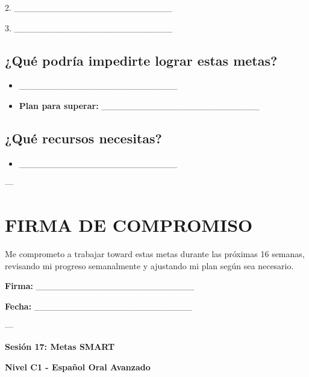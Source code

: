 \documentclass[a4paper,11pt]{article}
\begin{document}
2. _________________________

3. _________________________

\vspace{0.2cm}

\subsection{¿Qué podría impedirte lograr estas metas?}

\begin{itemize}

  \item _________________________

  \item \textbf{Plan para superar:} _________________________

\end{itemize}

\vspace{0.2cm}

\subsection{¿Qué recursos necesitas?}

\begin{itemize}

  \item _________________________

\end{itemize}

\vspace{0.2cm}

---

\vspace{0.2cm}

\section{FIRMA DE COMPROMISO}

\vspace{0.2cm}

Me comprometo a trabajar toward estas metas durante las próximas 16 semanas, revisando mi progreso semanalmente y ajustando mi plan según sea necesario.

\vspace{0.2cm}

\textbf{Firma:} _________________________

\textbf{Fecha:} _________________________

\vspace{0.2cm}

---

\vspace{0.2cm}

\textbf{Sesión 17: Metas SMART}

\textbf{Nivel C1 - Español Oral Avanzado}

\vspace{0.2cm}
\end{document}
